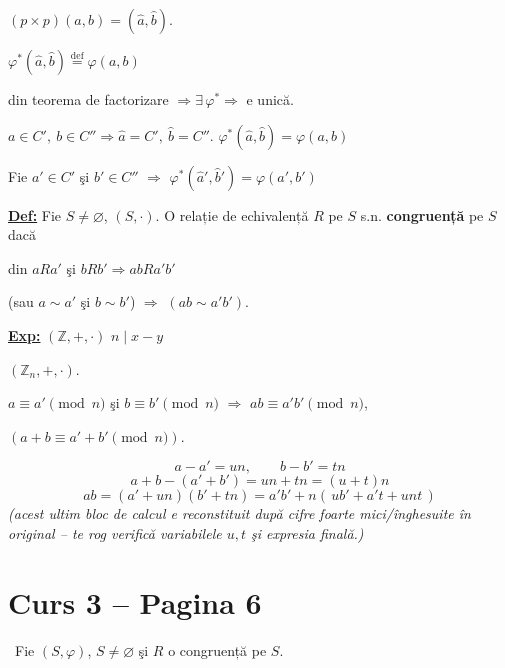 \noindent $(p\times p)(a,b) = (\hat a,\hat b)$.

\noindent $\varphi^*(\hat a,\hat b) \overset{\text{def}}{=} \varphi(a,b)$

\noindent din teorema de factorizare $\Rightarrow \exists\, \varphi^* \Rightarrow$ e unică.

\begin{center}
\end{center}

\noindent $a\in C',\ b\in C'' \Rightarrow \hat a = C',\ \hat b = C''$. \quad $\varphi^*(\hat a,\hat b) = \varphi(a,b)$

\noindent Fie $a'\in C'$ şi $b'\in C''$ $\Rightarrow$ $\varphi^*(\hat a',\hat b') = \varphi(a',b')$

\bigskip
\noindent\underline{\textbf{Def:}} Fie $S\neq\varnothing$, $(S,\cdot)$. O relație de echivalență $R$ pe $S$ s.n. \textbf{congruență} pe $S$ dacă

\noindent din $aRa'$ şi $bRb' \Rightarrow abRa'b'$

\noindent (sau $a\sim a'$ şi $b\sim b'$) $\Rightarrow$ $(ab\sim a'b')$.

\bigskip
\noindent\underline{\textbf{Exp:}} $(\mathbb{Z},+,\cdot)$ \qquad $n \mid x-y$

\noindent $(\mathbb{Z}_n,+,\cdot)$.

\noindent $a\equiv a' \pmod n$ şi $b\equiv b' \pmod n$ $\Rightarrow$ $ab\equiv a'b' \pmod n$,

\noindent $(a+b\equiv a'+b' \pmod n)$.

\[
a-a' = un,\qquad b-b'=tn
\]
\[
a+b-(a'+b') = un+tn = (u+t)n
\]
\[
ab = (a'+un)(b'+tn) = a'b' + n(\,ub'+a't+unt\,)
\]
\noindent\textit{(acest ultim bloc de calcul e reconstituit după cifre foarte mici/înghesuite în original -- te rog verifică variabilele $u,t$ şi expresia finală.)}




\section*{Curs 3 -- Pagina 6}

\noindent{} \ Fie $(S,\varphi)$, $S\neq\varnothing$ şi $R$ o congruență pe $S$.

